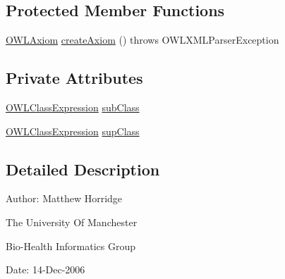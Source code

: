 \subsection*{Protected Member Functions}
\begin{DoxyCompactItemize}
\item 
\hyperlink{interfaceorg_1_1semanticweb_1_1owlapi_1_1model_1_1_o_w_l_axiom}{O\-W\-L\-Axiom} \hyperlink{classorg_1_1coode_1_1owlapi_1_1owlxmlparser_1_1_o_w_l_sub_class_axiom_element_handler_af43088162681148ffdcb972e31fc786a}{create\-Axiom} ()  throws O\-W\-L\-X\-M\-L\-Parser\-Exception 
\end{DoxyCompactItemize}
\subsection*{Private Attributes}
\begin{DoxyCompactItemize}
\item 
\hyperlink{interfaceorg_1_1semanticweb_1_1owlapi_1_1model_1_1_o_w_l_class_expression}{O\-W\-L\-Class\-Expression} \hyperlink{classorg_1_1coode_1_1owlapi_1_1owlxmlparser_1_1_o_w_l_sub_class_axiom_element_handler_aab4f000d190be3413710292b938e8176}{sub\-Class}
\item 
\hyperlink{interfaceorg_1_1semanticweb_1_1owlapi_1_1model_1_1_o_w_l_class_expression}{O\-W\-L\-Class\-Expression} \hyperlink{classorg_1_1coode_1_1owlapi_1_1owlxmlparser_1_1_o_w_l_sub_class_axiom_element_handler_a1b369d1df8d300cc84b39747764c1f51}{sup\-Class}
\end{DoxyCompactItemize}


\subsection{Detailed Description}
Author\-: Matthew Horridge\par
 The University Of Manchester\par
 Bio-\/\-Health Informatics Group\par
 Date\-: 14-\/\-Dec-\/2006\par
\par
 


